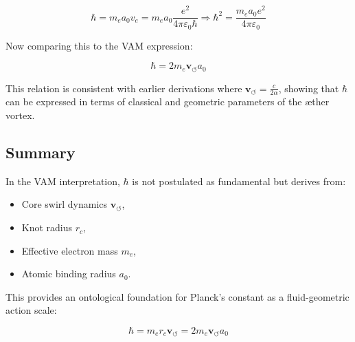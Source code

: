 \begin{equation}
    \hbar = m_e a_0 v_e = m_e a_0 \frac{e^2}{4\pi \varepsilon_0 \hbar} \Rightarrow \hbar^2 = \frac{m_e a_0 e^2}{4\pi \varepsilon_0}
\end{equation}

Now comparing this to the VAM expression:

\begin{equation}
    \boxed{\hbar = 2 m_e \mathbf{v}_{\scriptscriptstyle\boldsymbol{\circlearrowleft}} a_0}
\end{equation}

This relation is consistent with earlier derivations where \( \mathbf{v}_{\scriptscriptstyle\boldsymbol{\circlearrowleft}} = \frac{c}{2\alpha} \), showing that \( \hbar \) can be expressed in terms of classical and geometric parameters of the æther vortex.

\subsection*{Summary}

In the VAM interpretation, \( \hbar \) is not postulated as fundamental but derives from:

\begin{itemize}
    \item Core swirl dynamics \( \mathbf{v}_{\scriptscriptstyle\boldsymbol{\circlearrowleft}} \),
    \item Knot radius \( r_c \),
    \item Effective electron mass \( m_e \),
    \item Atomic binding radius \( a_0 \).
\end{itemize}

This provides an ontological foundation for Planck's constant as a fluid-geometric action scale:

\begin{equation}
    \boxed{\hbar = m_e r_c \mathbf{v}_{\scriptscriptstyle\boldsymbol{\circlearrowleft}} = 2 m_e \mathbf{v}_{\scriptscriptstyle\boldsymbol{\circlearrowleft}} a_0}
\end{equation}